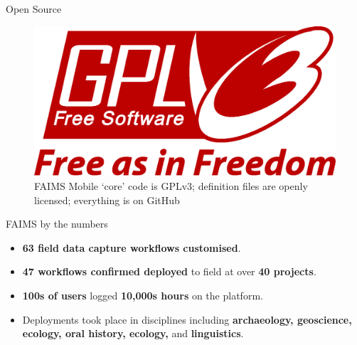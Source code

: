 \documentclass[aspectratio=169, 12pt]{beamer} %
\begin{document}
\begin{frame}{Open Source}
 \begin{figure}[H]
    \centering
        \includegraphics[width=.75\textwidth]{figures/GPLv3_Logo.eps}
        \caption{FAIMS Mobile `core' code is GPLv3; definition files are openly licensed; everything is on GitHub}
        \label{fig:FAIMS-github-OSS}
 \end{figure}
\end{frame}


\begin{frame}{FAIMS by the numbers}
 \begin{itemize}[label=\textbullet]
        \item \textbf{63 field data capture workflows customised}.
        \item \textbf{47 workflows confirmed deployed} to field at over \textbf{40 projects}.
        \item \textbf{100s of users} logged \textbf{10,000s hours} on the platform.
        \item Deployments took place in disciplines including \textbf{archaeology, geoscience, ecology, oral history, ecology, }and \textbf{linguistics}.
    \end{itemize}
\end{frame}
\end{document}
